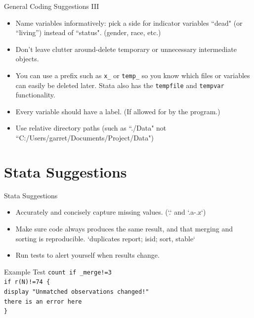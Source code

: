 \documentclass{beamer}
\begin{document}
\begin{frame}{General Coding Suggestions III}
\begin{itemize}

\item  Name variables informatively: pick a side for indicator variables ``dead" (or ``living'') instead of ``status". (gender, race, etc.)

\item Don't leave clutter around-delete temporary or unnecessary intermediate objects. 

\item You can use a prefix such as \texttt{x\_} or \texttt{temp\_} so you know which files or variables can easily be deleted later. Stata also has the \texttt{tempfile} and \texttt{tempvar} functionality.  

\item Every variable should have a label. (If allowed for by the program.)

\item  Use relative directory paths (such as ``./Data" not ``C:/Users/garret/Documents/Project/Data") 

\end{itemize}
\end{frame}


\section{Stata Suggestions}
\begin{frame}{Stata Suggestions}
\begin{itemize}
\item Accurately and concisely capture missing values. (`.` and `.a-.z`)

\item Make sure code always produces the same result, and that merging and sorting is reproducible. `duplicates report; isid; sort, stable`  

\item	Run tests to alert yourself when results change. 
\end{itemize}
\end{frame}

\begin{frame}{Example Test}
\texttt{count if \_merge!=3 \\ if r(N)!=74 \{ \\ display "Unmatched observations changed!" \\ there is an error here \\  \}   }
\end{frame}
   
\end{document}
